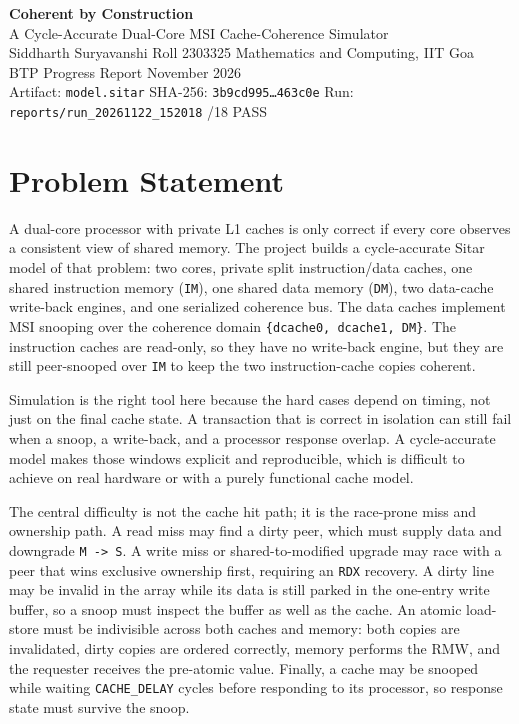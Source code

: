 \documentclass[11pt,a4paper]{article}
\newcommand{\code}[1]{\texttt{\small #1}}
\begin{document}
\begin{center}
{\color{ink}\LARGE\bfseries Coherent by Construction}\\[2pt]
{\large A Cycle-Accurate Dual-Core MSI Cache-Coherence Simulator}\\[7pt]
{\normalsize Siddharth Suryavanshi \quad Roll 2303325 \quad Mathematics and Computing, IIT Goa}\\[2pt]
{\small BTP Progress Report  November 2026}\\[5pt]
{\footnotesize\color{muted}Artifact: \code{model.sitar} \quad SHA-256: \code{3b9cd995\ldots463c0e} \quad Run: \code{reports/run\_20261122\_152018} /18 PASS}
\end{center}

\vspace{-2pt}
\section{Problem Statement}
A dual-core processor with private L1 caches is only correct if every core observes a
consistent view of shared memory. The project builds a cycle-accurate Sitar model of
that problem: two cores, private split instruction/data caches, one shared instruction
memory (\code{IM}), one shared data memory (\code{DM}), two data-cache write-back
engines, and one serialized coherence bus. The data caches implement MSI snooping over
the coherence domain \code{\{dcache0, dcache1, DM\}}. The instruction caches are
read-only, so they have no write-back engine, but they are still peer-snooped over
\code{IM} to keep the two instruction-cache copies coherent.

Simulation is the right tool here because the hard cases depend on timing, not just on
the final cache state. A transaction that is correct in isolation can still fail when a
snoop, a write-back, and a processor response overlap. A cycle-accurate model makes those
windows explicit and reproducible, which is difficult to achieve on real hardware or with
a purely functional cache model.

The central difficulty is not the cache hit path; it is the race-prone miss and
ownership path. A read miss may find a dirty peer, which must supply data and downgrade
\code{M -> S}. A write miss or shared-to-modified upgrade may race with a peer that
wins exclusive ownership first, requiring an \code{RDX} recovery. A dirty line may be
invalid in the array while its data is still parked in the one-entry write buffer, so a
snoop must inspect the buffer as well as the cache. An atomic load-store must be
indivisible across both caches and memory: both copies are invalidated, dirty copies are
ordered correctly, memory performs the RMW, and the requester receives the pre-atomic
value. Finally, a cache may be snooped while waiting \code{CACHE\_DELAY} cycles before
responding to its processor, so response state must survive the snoop.
\end{document}
